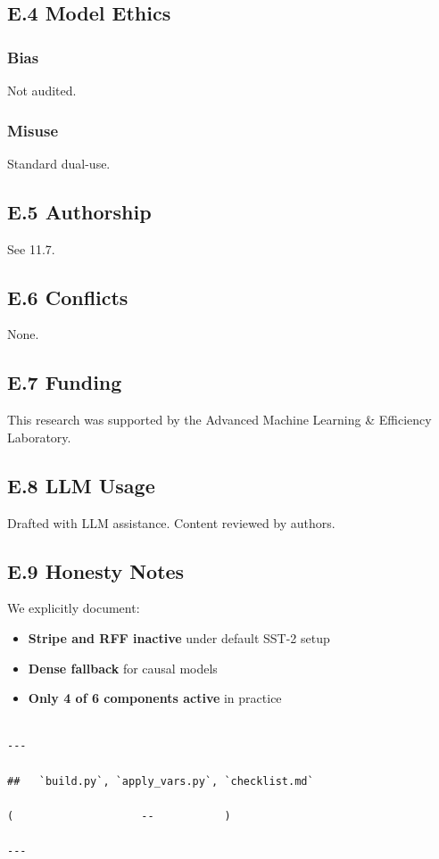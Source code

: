 \subsection{E.4 Model Ethics}

\subsubsection{Bias}
Not audited.

\subsubsection{Misuse}
Standard dual-use.

\subsection{E.5 Authorship}

See  11.7.

\subsection{E.6 Conflicts}

None.

\subsection{E.7 Funding}

This research was supported by the Advanced Machine Learning \& Efficiency Laboratory.

\subsection{E.8 LLM Usage}

Drafted with LLM assistance. Content reviewed by authors.

\subsection{E.9 Honesty Notes}

We explicitly document:
\begin{itemize}
\item \textbf{Stripe and RFF inactive} under default SST-2 setup
\item \textbf{Dense fallback} for causal models
\item \textbf{Only 4 of 6 components active} in practice
\end{itemize}
\begin{lstlisting}

---

##   `build.py`, `apply_vars.py`, `checklist.md`

(                    --           )

---
\end{lstlisting}